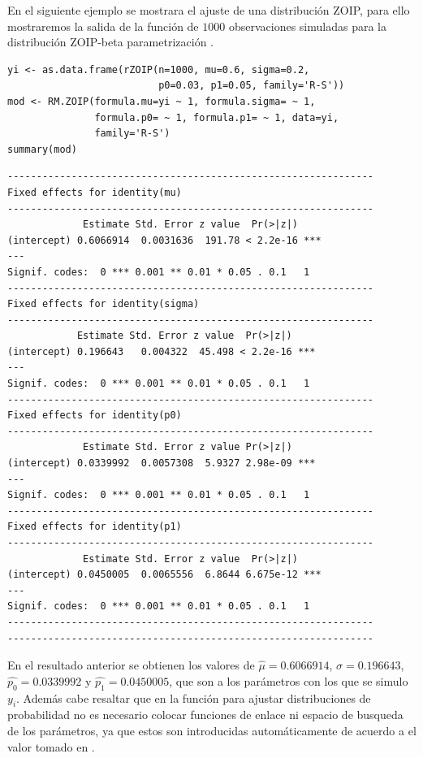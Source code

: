En el siguiente ejemplo se mostrara el ajuste de una distribuci\'{o}n ZOIP, para ello mostraremos la salida de la funci\'{o}n  de $1000$ observaciones simuladas para la distribuci\'{o}n ZOIP-beta parametrizaci\'{o}n \cite{Stasinopoulos2}.\\

\begin{verbatim}
yi <- as.data.frame(rZOIP(n=1000, mu=0.6, sigma=0.2,
                          p0=0.03, p1=0.05, family='R-S'))
mod <- RM.ZOIP(formula.mu=yi ~ 1, formula.sigma= ~ 1, 
               formula.p0= ~ 1, formula.p1= ~ 1, data=yi,
               family='R-S')
summary(mod)
\end{verbatim}

\begin{verbatim}
---------------------------------------------------------------
Fixed effects for identity(mu)
---------------------------------------------------------------
             Estimate Std. Error z value  Pr(>|z|)    
(intercept) 0.6066914  0.0031636  191.78 < 2.2e-16 ***
---
Signif. codes:  0 *** 0.001 ** 0.01 * 0.05 . 0.1   1
---------------------------------------------------------------
Fixed effects for identity(sigma)
---------------------------------------------------------------
            Estimate Std. Error z value  Pr(>|z|)    
(intercept) 0.196643   0.004322  45.498 < 2.2e-16 ***
---
Signif. codes:  0 *** 0.001 ** 0.01 * 0.05 . 0.1   1
---------------------------------------------------------------
Fixed effects for identity(p0)
---------------------------------------------------------------
             Estimate Std. Error z value Pr(>|z|)    
(intercept) 0.0339992  0.0057308  5.9327 2.98e-09 ***
---
Signif. codes:  0 *** 0.001 ** 0.01 * 0.05 . 0.1   1
---------------------------------------------------------------
Fixed effects for identity(p1)
---------------------------------------------------------------
             Estimate Std. Error z value  Pr(>|z|)    
(intercept) 0.0450005  0.0065556  6.8644 6.675e-12 ***
---
Signif. codes:  0 *** 0.001 ** 0.01 * 0.05 . 0.1   1
---------------------------------------------------------------
---------------------------------------------------------------
\end{verbatim}

En el resultado anterior se obtienen los valores de $\hat{\mu}=0.6066914$, $\hat{\sigma}=0.196643$, $\hat{p_0}=0.0339992$ y $\hat{p_1}=0.0450005$, que son a los par\'{a}metros con los que se simulo $y_i$. Adem\'{a}s cabe resaltar que en la funci\'{o}n  para ajustar distribuciones de probabilidad no es necesario colocar funciones de enlace ni espacio de busqueda de los par\'{a}metros, ya que estos son introducidas autom\'{a}ticamente de acuerdo a el valor tomado en .

